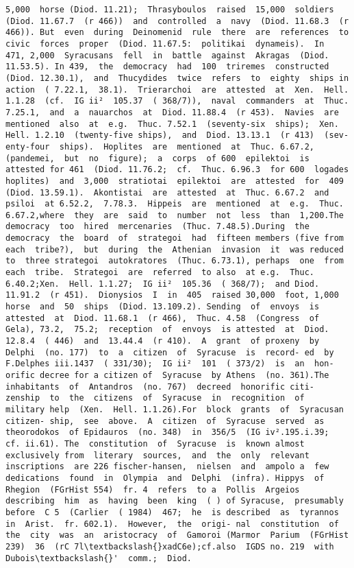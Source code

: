 \documentclass[11pt]{article}
\begin{document}
\begin{Verbatim}[commandchars=\\\{\}]
5,000  horse (Diod. 11.21);  Thrasyboulos  raised  15,000  soldiers  (Diod. 11.67.7  (r 466))  and  controlled  a  navy  (Diod. 11.68.3  (r 466)). But  even  during  Deinomenid  rule  there  are  references  to civic  forces  proper  (Diod. 11.67.5:  politikai  dynameis).  In  471, 2,000  Syracusans  fell  in  battle  against  Akragas  (Diod. 11.53.5). In 439,  the  democracy  had  100  triremes  constructed (Diod. 12.30.1),  and  Thucydides  twice  refers  to  eighty  ships in  action  ( 7.22.1,  38.1).  Trierarchoi  are  attested  at  Xen.  Hell. 1.1.28  (cf.  IG ii²  105.37  ( 368/7)),  naval  commanders  at  Thuc. 7.25.1,  and  a  nauarchos  at  Diod. 11.88.4  (r 453).  Navies  are mentioned  also  at  e.g.  Thuc. 7.52.1  (seventy-six  ships);  Xen. Hell. 1.2.10  (twenty-five ships),  and  Diod. 13.13.1  (r 413)  (sev- enty-four  ships).  Hoplites  are  mentioned  at  Thuc. 6.67.2, (pandemei,  but  no  figure);  a  corps  of 600  epilektoi  is  attested for 461  (Diod. 11.76.2;  cf.  Thuc. 6.96.3  for 600  logades hoplites)  and  3,000  stratiotai  epilektoi  are  attested  for  409 (Diod. 13.59.1).  Akontistai  are  attested  at  Thuc. 6.67.2  and psiloi  at 6.52.2,  7.78.3.  Hippeis  are  mentioned  at  e.g.  Thuc. 6.67.2,where  they  are  said  to  number  not  less  than  1,200.The democracy  too  hired  mercenaries  (Thuc. 7.48.5).During  the democracy  the  board  of  strategoi  had  fifteen members (five from  each  tribe?),  but  during  the  Athenian  invasion  it  was reduced to  three strategoi  autokratores  (Thuc. 6.73.1), perhaps  one  from  each  tribe.  Strategoi  are  referred  to also  at e.g.  Thuc. 6.40.2;Xen.  Hell. 1.1.27;  IG ii²  105.36  ( 368/7);  and Diod. 11.91.2  (r 451).  Dionysios  I  in  405  raised 30,000  foot, 1,000  horse  and  50  ships  (Diod. 13.109.2). Sending  of  envoys  is  attested  at  Diod. 11.68.1  (r 466),  Thuc. 4.58  (Congress  of  Gela), 73.2,  75.2;  reception  of  envoys  is attested  at  Diod. 12.8.4  ( 446)  and  13.44.4  (r 410).  A  grant  of proxeny  by Delphi  (no. 177)  to  a  citizen  of  Syracuse  is  record- ed  by F.Delphes iii.1437  ( 331/30);  IG ii²  101  ( 373/2)  is  an  hon- orific decree for a citizen of  Syracuse  by Athens  (no. 361).The inhabitants  of  Antandros  (no. 767)  decreed  honorific citi- zenship  to  the  citizens  of  Syracuse  in  recognition  of  military help  (Xen.  Hell. 1.1.26).For  block  grants  of  Syracusan  citizen- ship,  see  above.  A  citizen  of  Syracuse  served  as  theorodokos  of Epidauros  (no. 348)  in  356/5  (IG iv².195.i.39;  cf. ii.61). The  constitution  of  Syracuse  is  known almost  exclusively from  literary  sources,  and  the  only  relevant  inscriptions  are 226 fischer-hansen,  nielsen  and  ampolo a  few  dedications  found  in  Olympia  and  Delphi  (infra). Hippys  of  Rhegion  (FGrHist 554)  fr. 4  refers  to a  Pollis  Argeios describing  him  as  having  been  king  ( ) of Syracuse,  presumably  before  C 5  (Carlier  ( 1984)  467;  he  is described  as  tyrannos  in  Arist.  fr. 602.1).  However,  the  origi- nal  constitution  of  the  city  was  an  aristocracy  of  Gamoroi (Marmor  Parium  (FGrHist 239)  36  (rC 7l\textbackslash{}xadC6e);cf.also  IGDS no. 219  with  Dubois\textbackslash{}'  comm.;  Diod. 
\end{Verbatim}
\end{document}
